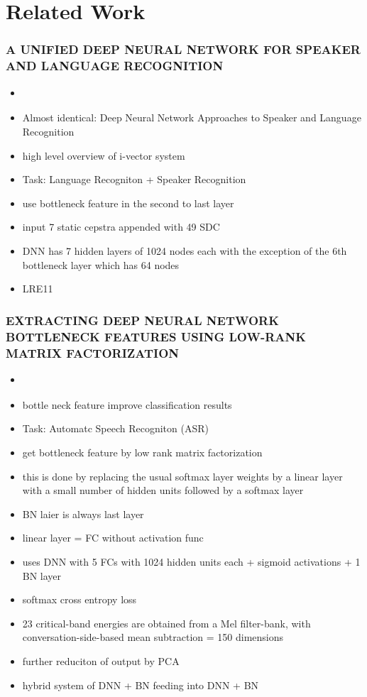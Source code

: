 \section{Related Work}

    \subsubsection{A UNIFIED DEEP NEURAL NETWORK FOR SPEAKER AND LANGUAGE RECOGNITION}
    \begin{itemize}
        \item \cite{richardson2015unified}
        \item Almost identical: Deep Neural Network Approaches to Speaker and Language Recognition \cite{richardson2015deep}
        \item high level overview of i-vector system
        \item Task: Language Recogniton + Speaker Recognition
        \item use bottleneck feature in the second to last layer
        \item input 7 static cepstra appended with 49 SDC
        \item DNN has 7 hidden layers of 1024 nodes each with the exception of the 6th bottleneck layer which has 64 nodes
        \item LRE11
    \end{itemize}
    
    \subsubsection{EXTRACTING DEEP NEURAL NETWORK BOTTLENECK FEATURES USING LOW-RANK MATRIX FACTORIZATION
    }
    \begin{itemize}
        \item \cite{zhang2014extracting}
        \item bottle neck feature improve classification results
        \item Task: Automatc Speech Recogniton (ASR)
        \item get bottleneck feature by low rank matrix factorization
        \item this is done by replacing the usual softmax layer weights by a linear layer with a small number of hidden units followed by a softmax layer
        \item BN laier is always last layer
        \item linear layer = FC without activation func
        \item uses DNN with 5 FCs with 1024 hidden units each + sigmoid activations + 1 BN layer
        \item softmax cross entropy loss 
        \item 23 critical-band energies are obtained from a Mel filter-bank, with conversation-side-based mean subtraction = 150 dimensions
        \item further reduciton of output by PCA
        \item hybrid system of DNN + BN feeding into DNN + BN
        
    \end{itemize}

